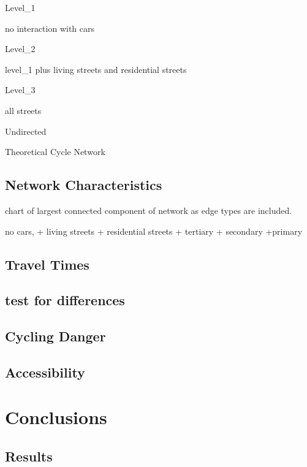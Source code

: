 \documentclass[11pt]{article} %
\begin{document}

Level\_1

no interaction with cars

Level\_2

level\_1 plus living streets and residential streets

Level\_3

all streets 

Undirected

Theoretical Cycle Network

\subsection{Network Characteristics}



chart of largest connected component of network as edge types are included. 

no cars,
+ living streets
+ residential streets
+ tertiary 
+ secondary
+primary

\subsection{Travel Times}

\subsection{test for differences}

\subsection{Cycling Danger}

\subsection{Accessibility}

\section{Conclusions}

\subsection{Results}
\end{document}
